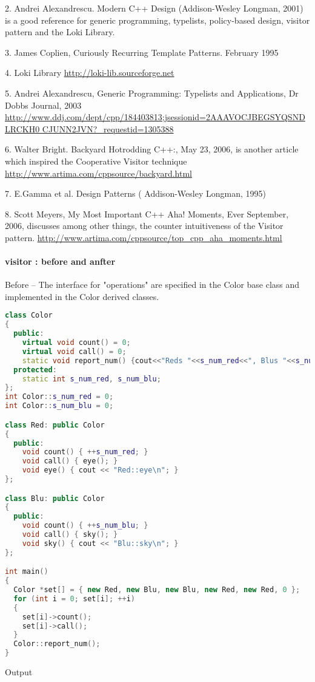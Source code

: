 \documentclass{book}
\begin{document}
2. Andrei Alexandrescu. Modern C++ Design (Addison-Wesley Longman, 2001) is a good reference for generic programming, typelists, policy-based design, visitor pattern and the Loki Library.

3. James Coplien, Curiously Recurring Template Patterns. February 1995

4. Loki Library
\url{http://loki-lib.sourceforge.net}

5. Andrei Alexandrescu, Generic Programming: Typelists and Applications, Dr Dobbs Journal, 2003
\url{http://www.ddj.com/dept/cpp/184403813;jsessionid=2AAAVOCJBEGSYQSNDLRCKH0 CJUNN2JVN?_requestid=1305388}

6. Walter Bright. Backyard Hotrodding C++:, May 23, 2006, is another article which inspired the Cooperative Visitor technique
\url{http://www.artima.com/cppsource/backyard.html}

7. E.Gamma et al. Design Patterns ( Addison-Wesley Longman, 1995)

8. Scott Meyers, My Most Important C++ Aha! Moments, Ever September, 2006, discusses among other things, the counter intuitiveness of the Visitor pattern.
\url{http://www.artima.com/cppsource/top_cpp_aha_moments.html}



\paragraph{visitor : before and anfter}\mbox{}
Before -- The interface for "operations" are specified in the Color base class and implemented in the Color derived classes.

\begin{lstlisting}[caption={Before},label={lst:be},language=C++]
class Color
{
  public:
    virtual void count() = 0;
    virtual void call() = 0;
    static void report_num() {cout<<"Reds "<<s_num_red<<", Blus "<<s_num_blu<<'\n';}
  protected:
    static int s_num_red, s_num_blu;
};
int Color::s_num_red = 0;
int Color::s_num_blu = 0;

class Red: public Color
{
  public:
    void count() { ++s_num_red; }
    void call() { eye(); }
    void eye() { cout << "Red::eye\n"; }
};

class Blu: public Color
{
  public:
    void count() { ++s_num_blu; }
    void call() { sky(); }
    void sky() { cout << "Blu::sky\n"; }
};

int main()
{
  Color *set[] = { new Red, new Blu, new Blu, new Red, new Red, 0 };
  for (int i = 0; set[i]; ++i)
  {
    set[i]->count();
    set[i]->call();
  }
  Color::report_num();
}
\end{lstlisting}
Output
\end{document}

